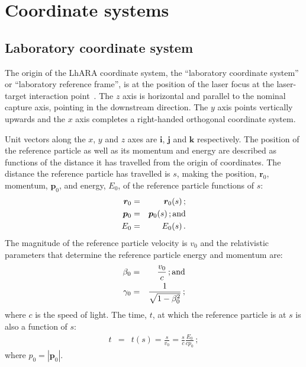 \graphicspath{ {02-CoordinateSystems/Figures/} }

\section{Coordinate systems}

\subsection{Laboratory coordinate system}

The origin of the LhARA coordinate system, the ``laboratory coordinate
system'' or ``laboratory reference frame'', is at the position of the
laser focus at the laser-target interaction
point~\cite{LhARA:Baseline:September:2022}.
The $z$ axis is horizontal and parallel to the nominal capture axis,
pointing in the downstream direction.
The $y$ axis points vertically upwards and the $x$ axis completes a
right-handed orthogonal coordinate system. 

Unit vectors along the $x$, $y$ and $z$ axes are $\bm{i}$, $\bm{j}$
and $\bm{k}$ respectively.
The position of the reference particle as well as its momentum and
energy are described as functions of the distance it has travelled
from the origin of coordinates.
The distance the reference particle has travelled is $s$, making the
position, $\bm{r}_0$, momentum, $\bm{p}_0$, and energy, $E_0$, of the
reference particle functions of $s$: 
\begin{eqnarray}
  \bm{r}_0 & = & \bm{r}_0(s)\, ;           \nonumber \\
  \bm{p}_0 & = & \bm{p}_0(s)\, {\rm ; and}           \\
       E_0 & = &      E_0(s)\, .           \nonumber
\end{eqnarray}
The magnitude of the reference particle velocity is $v_0$ and the
relativistic parameters that determine the reference particle energy
and momentum are:
\begin{eqnarray}
  \beta_0  & = & \frac{v_0}{c}                  \, {\rm ; and} \nonumber \\
  \gamma_0 & = & \frac{1}{\sqrt{1 - \beta^2_0}} \,; \nonumber
\end{eqnarray}
where $c$ is the speed of light.
The time, $t$, at which the reference particle is at $s$ is also a
function of $s$:
\begin{eqnarray}
        t  & = & t(s) = \frac{s}{v_0} = \frac{s}{c} \frac{E_0}{c p_0}\, ;
\end{eqnarray}
where $p_0=\left|\bm{p}_0\right|$.

